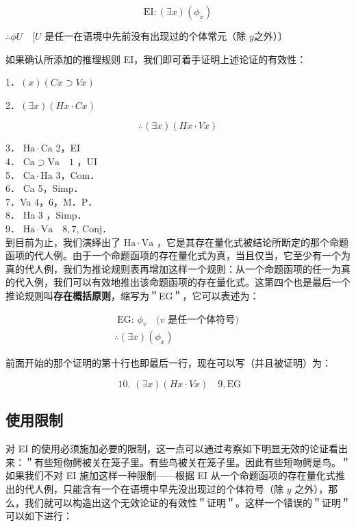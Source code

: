 $$
\mathrm{EI}:(\exists x)\left(\phi_{x}\right)
$$

$\therefore \phi U \quad[U$ 是任一在语境中先前没有出现过的个体常元（除 $y$之外）〕

如果确认所添加的推理规则 EI，我们即可着手证明上述论证的有效性：

1．$(x)(C x \supset V x)$

2．$(\exists x)(H x \cdot C x)$

$$
\therefore(\exists x)(H x \cdot V x)
$$

3． $\mathrm{Ha} \cdot \mathrm{Ca}$ 2，EI\\
4． $\mathrm{Ca} \supset \mathrm{Va} \quad 1$ ，UI\\
5． $\mathrm{Ca} \cdot \mathrm{Ha}$ 3，Com．\\
6． Ca 5，Simp．\\
7．Va 4，6，M．P．\\
8． Ha 3 ，Simp．\\
9． $\mathrm{Ha \cdot Va} \quad 8,7$, Conj．\\
到目前为止，我们演绎出了 $\mathrm{Ha} \cdot \mathrm{Va}$ ，它是其存在量化式被结论所断定的那个命题函项的代人例。由于一个命题函项的存在量化式为真，当且仅当，它至少有一个为真的代人例，我们为推论规则表再增加这样一个规则：从一个命题函项的任一为真的代入例，我们可以有效地推出该命题函项的存在量化式。这第四个也是最后一个推论规则叫\textbf{存在概括原则}，缩写为＂EG＂，它可以表述为：

$$
\begin{gathered}
\text { EG: } \phi_{v} \quad(v \text { 是任一个体符号) } \\
\therefore(\exists x)\left(\phi_{x}\right)
\end{gathered}
$$

前面开始的那个证明的第十行也即最后一行，现在可以写（并且被证明）为：

$$
\text { 10. }(\exists x)(H x \cdot V x) \quad 9, \mathrm{EG}
$$

\subsection{使用限制}

对 EI 的使用必须施加必要的限制，这一点可以通过考察如下明显无效的论证看出来：＂有些短伆鳄被关在笼子里。有些鸟被关在笼子里。因此有些短吻鳄是鸟。＂如果我们不对 EI 施加这样一种限制——根据 EI 从一个命题函项的存在量化式推出的代人例，只能含有一个在语境中早先没出现过的个体符号（除 $y$ 之外），那么，我们就可以构造出这个无效论证的有效性＂证明＂。这样一个错误的＂证明＂可以如下进行：

